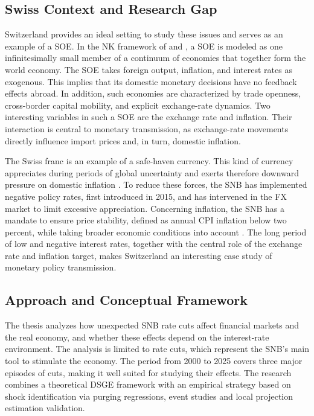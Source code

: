 \documentclass[12pt,a4paper]{article}
\begin{document}
\subsection{Swiss Context and Research Gap}
\label{subsec:gap}
Switzerland provides an ideal setting to study these issues and serves as an example of a SOE. In the NK framework of \citet{gali2005} and \citet{gali2008}, a SOE is modeled as one infinitesimally small member of a continuum of economies that together form the world economy. The SOE takes foreign output, inflation, and interest rates as exogenous. This implies that its domestic monetary decisions have no feedback effects abroad. In addition, such economies are characterized by trade openness, cross-border capital mobility, and explicit exchange-rate dynamics. Two interesting variables in such a SOE are the exchange rate and inflation. Their interaction is central to monetary transmission, as exchange-rate movements directly influence import prices and, in turn, domestic inflation.


The Swiss franc is an example of a safe-haven currency. This kind of currency appreciates during periods of global uncertainty and exerts therefore downward pressure on domestic inflation \citep{ranaldo2010}. To reduce these forces, the SNB has implemented negative policy rates, first introduced in 2015, and has intervened in the FX market to limit excessive appreciation. Concerning inflation, the SNB has a mandate to ensure price stability, defined as annual CPI inflation below two percent, while taking broader economic conditions into account \citep{snb_strategy}. The long period of low and negative interest rates, together with the central role of the exchange rate and inflation target, makes Switzerland an interesting case study of monetary policy transmission.


\subsection{Approach and Conceptual Framework}
\label{subsec:approach}
The thesis analyzes how unexpected SNB rate cuts affect financial markets and the real economy, and whether these effects depend on the interest-rate environment. The analysis is limited to rate cuts, which represent the SNB’s main tool to stimulate the economy. The period from 2000 to 2025 covers three major episodes of cuts, making it well suited for studying their effects. The research combines a theoretical DSGE framework with an empirical strategy based on shock identification via purging regressions, event studies and local projection estimation validation.
\end{document}
